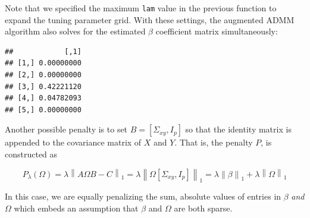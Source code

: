 \documentclass[11pt,]{report}
\newenvironment{Shaded}{\begin{snugshade}}{\end{snugshade}}
\newcommand{\CommentTok}[1]{\textcolor[rgb]{0.56,0.35,0.01}{\textit{#1}}}
\newcommand{\DataTypeTok}[1]{\textcolor[rgb]{0.13,0.29,0.53}{#1}}
\newcommand{\DecValTok}[1]{\textcolor[rgb]{0.00,0.00,0.81}{#1}}
\newcommand{\FloatTok}[1]{\textcolor[rgb]{0.00,0.00,0.81}{#1}}
\newcommand{\KeywordTok}[1]{\textcolor[rgb]{0.13,0.29,0.53}{\textbf{#1}}}
\newcommand{\NormalTok}[1]{#1}
\newcommand{\OperatorTok}[1]{\textcolor[rgb]{0.81,0.36,0.00}{\textbf{#1}}}
\begin{document}
Note that we specified the maximum \texttt{lam} value in the previous function to expand the tuning parameter grid. With these settings, the augmented ADMM algorithm also solves for the estimated \(\beta\) coefficient matrix simultaneously:

\vspace{0.5cm}

\begin{Shaded}
\end{Shaded}

\begin{verbatim}
##            [,1]
## [1,] 0.00000000
## [2,] 0.00000000
## [3,] 0.42221120
## [4,] 0.04782093
## [5,] 0.00000000
\end{verbatim}

\vspace{0.5cm}

Another possible penalty is to set \(B = \left[ \Sigma_{xy}, I_{p} \right]\) so that the identity matrix is appended to the covariance matrix of \(X\) and \(Y\). That is, the penalty \(P\), is constructed as

\[ P_{\lambda}\left(\Omega \right) = \lambda\left\| A\Omega B - C \right\|_{1} = \lambda\left\| \Omega\left[\Sigma_{xy}, I_{p}\right] \right\|_{1} = \lambda\left\| \beta \right\|_{1} + \lambda\left\| \Omega \right\|_{1} \]

In this case, we are equally penalizing the sum, absolute values of entries in \(\beta\) \emph{and} \(\Omega\) which embeds an assumption that \(\beta\) and \(\Omega\) are both sparse.

\vspace{0.5cm}

\begin{Shaded}
\end{Shaded}
\end{document}
